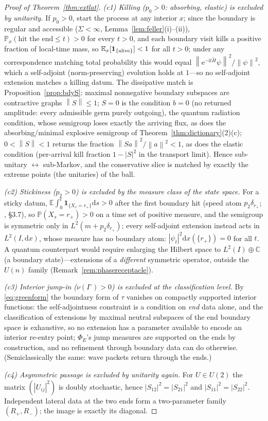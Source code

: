 \documentclass[11pt]{article}
\theoremstyle{definition}
\theoremstyle{remark}
\newcommand{\dd}{\mathrm{d}}
\newcommand{\ii}{\mathrm{i}}
\newcommand{\ee}{\mathrm{e}}
\newcommand{\norm}[1]{\left\lVert #1 \right\rVert}
\newcommand{\Prob}{\mathbb{P}}
\newcommand{\EE}{\mathbb{E}}
\begin{document}
\begin{proof}[Proof of Theorem~\ref{thm:extlat}]
\emph{(c1) Killing ($p_{0}>0$: absorbing, elastic) is excluded by
unitarity.} If $p_{0}>0$, start the process at any interior $x$; since
the boundary is regular and accessible ($\Sigma<\infty$,
Lemma~\ref{lem:feller}(i)--(ii)), $\Prob_{x}(\text{hit the end}\le
t)>0$ for every $t>0$, and each boundary visit kills a positive
fraction of local-time mass, so $\EE_{x}[\mathbf 1_{\{\rm
alive\}}]<1$ for all $t>0$; under any correspondence matching total
probability this would equal
$\norm{\ee^{-\ii t\tilde H}\psi}^{2}/\norm{\psi}^{2}$, which a self-adjoint
(norm-preserving) evolution holds at $1$---so no self-adjoint extension
matches a killing datum. The dissipative
match is Proposition~\ref{prop:bdyS}: maximal nonnegative boundary
subspaces are contractive graphs $\norm{S}\le1$; $S=0$ is the condition
$b=0$ (no returned amplitude: every admissible germ purely outgoing),
the quantum radiation condition, whose semigroup loses exactly the
arriving flux, as does the absorbing/minimal explosive semigroup of
Theorem~\ref{thm:dictionary}(2)(c); $0<\norm{S}<1$ returns the fraction
$\norm{Sa}^{2}/\norm{a}^{2}<1$, as does the elastic condition
(per-arrival kill fraction $1-|S|^{2}$ in the transport limit). Hence
sub-unitary $\leftrightarrow$ sub-Markov, and the conservative slice is
matched by exactly the extreme points (the unitaries) of the ball.

\emph{(c2) Stickiness ($p_{2}>0$) is excluded by the measure class of
the state space.} For a sticky datum,
$\EE\int_{0}^{t}\mathbf 1_{\{X_{s}=r_{+}\}}\dd s>0$ after the first
boundary hit (speed atom $p_{2}\delta_{r_{+}}$; \cite{ItoMcKean},
\S3.7), so $\Prob(X_{s}=r_{+})>0$ on a time set of positive measure,
and the semigroup is symmetric only in $L^{2}(m+p_{2}\delta_{r_{+}})$;
every self-adjoint extension instead acts in $L^{2}(I,\dd x)$, whose
measure has no boundary atom: $|\psi_{t}|^{2}\dd x(\{r_{+}\})=0$ for
all $t$. A quantum counterpart would require enlarging the Hilbert
space to $L^{2}(I)\oplus\mathbb{C}$ (a boundary state)---extensions of
a \emph{different} symmetric operator, outside the $U(n)$ family
(Remark~\ref{rem:phasereceptacle}).

\emph{(c3) Interior jump-in ($\nu(I^{\circ})>0$) is excluded at the
classification level.} By \eqref{eq:greenform} the boundary form of
$\tau$ vanishes on compactly supported interior functions: the
self-adjointness constraint is a condition on \emph{end} data alone,
and the classification of extensions by maximal neutral subspaces of
the end boundary space is exhaustive, so no extension has a parameter
available to encode an interior re-entry point; $\Phi_{E}$'s jump
measures are supported on the ends by construction, and no refinement
through boundary data can do otherwise. (Semiclassically the same:
wave packets return through the ends.)

\emph{(c4) Asymmetric passage is excluded by unitarity again.} For
$U\in U(2)$ the matrix $(|U_{ij}|^{2})$ is doubly stochastic, hence
$|S_{12}|^{2}=|S_{21}|^{2}$ and $|S_{11}|^{2}=|S_{22}|^{2}$.
Independent lateral data at the two ends form a two-parameter family
$(R_{+},R_{-})$; the image is exactly its diagonal.
\end{proof}
\end{document}
